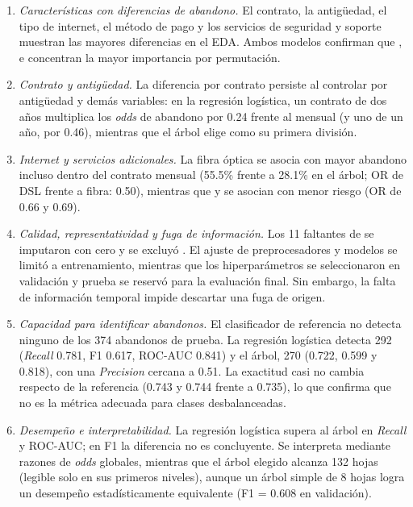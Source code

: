 \begin{enumerate}
    \item \emph{Características con diferencias de abandono.} El contrato, la antigüedad, el tipo de
    internet, el método de pago y los servicios de seguridad y soporte muestran las mayores
    diferencias en el EDA. Ambos modelos confirman que ,  e
     concentran la mayor importancia por permutación.

    \item \emph{Contrato y antigüedad.} La diferencia por contrato persiste al controlar por
    antigüedad y demás variables: en la regresión logística, un contrato de dos años multiplica los
    \emph{odds} de abandono por 0.24 frente al mensual (y uno de un año, por 0.46), mientras que el
    árbol elige  como su primera división.

    \item \emph{Internet y servicios adicionales.} La fibra óptica se asocia con mayor abandono
    incluso dentro del contrato mensual (55.5\% frente a 28.1\% en el árbol; OR de DSL frente a
    fibra: 0.50), mientras que  y  se asocian con menor riesgo
    (OR de 0.66 y 0.69).

    \item \emph{Calidad, representatividad y fuga de información.} Los 11 faltantes de
     se imputaron con cero y se excluyó .
    El ajuste de preprocesadores y modelos se limitó a entrenamiento,
    mientras que los hiperparámetros se seleccionaron en validación y prueba se reservó para la evaluación final.
    Sin embargo, la falta de información temporal impide descartar una fuga de origen.

    \item \emph{Capacidad para identificar abandonos.} El clasificador de referencia no detecta
    ninguno de los 374 abandonos de prueba. La regresión logística detecta 292 (\emph{Recall} 0.781,
    F1 0.617, ROC-AUC 0.841) y el árbol, 270 (0.722, 0.599 y 0.818), con una \emph{Precision} cercana
    a 0.51. La exactitud casi no cambia respecto de la referencia (0.743 y 0.744 frente a 0.735), lo
    que confirma que no es la métrica adecuada para clases desbalanceadas.

    \item \emph{Desempeño e interpretabilidad.} La regresión logística supera al árbol en
    \emph{Recall} y ROC-AUC; en F1 la diferencia no es concluyente. Se interpreta mediante razones de
    \emph{odds} globales, mientras que el árbol elegido alcanza 132 hojas (legible solo en sus
    primeros niveles), aunque un árbol simple de 8 hojas logra un desempeño estadísticamente
    equivalente (F1 = 0.608 en validación).
\end{enumerate}

